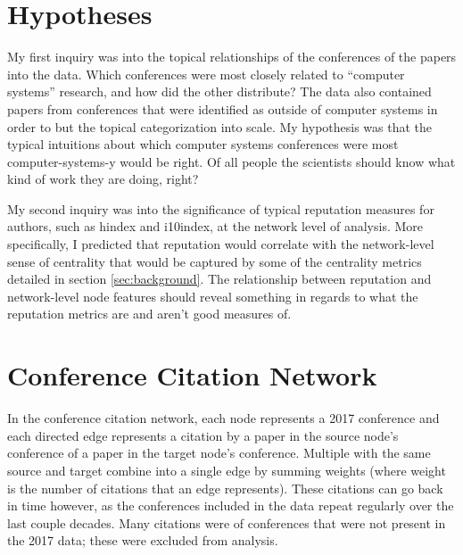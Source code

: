 \documentclass{article}
\begin{document}
\section{Hypotheses}
\label{sec:hypotheses}

My first inquiry was into the topical relationships of the conferences of the papers into the data.
Which conferences were most closely related to ``computer systems'' research, and how did the other distribute?
The data also contained papers from conferences that were identified as outside of computer systems in order to but the topical categorization into scale.
My hypothesis was that the typical intuitions about which computer systems conferences were most computer-systems-y would be right.
Of all people the scientists should know what kind of work they are doing, right?

My second inquiry was into the significance of typical reputation measures for authors, such as hindex and i10index, at the network level of analysis. More specifically, I predicted that reputation would correlate with the network-level sense of centrality that would be captured by some of the centrality metrics detailed in section \ref{sec:background}. The relationship between reputation and network-level node features should reveal something in regards to what the reputation metrics are and aren't good measures of.

\section{Conference Citation Network}
\label{conference-citation-network}

In the conference citation network, each node represents a 2017 conference and each directed edge represents a citation by a paper in the source node's conference of a paper in the target node's conference.
Multiple with the same source and target combine into a single edge by summing weights (where weight is the number of citations that an edge represents).
These citations can go back in time however, as the conferences included in the data repeat regularly over the last couple decades.
Many citations were of conferences that were not present in the 2017 data; these were excluded from analysis.
\end{document}
